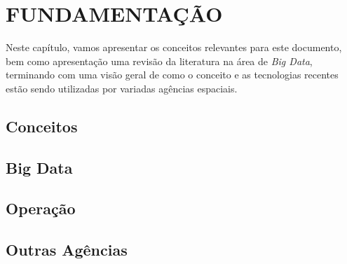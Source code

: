 
\chapter{FUNDAMENTAÇÃO}

Neste capítulo, vamos apresentar os conceitos relevantes para este documento, bem como apresentação uma revisão da literatura na área de \textit{Big Data}, terminando com uma visão geral de como o conceito e as tecnologias recentes estão sendo utilizadas por variadas agências espaciais.

\section{Conceitos}

\section{Big Data}

\section{Operação}

\section{Outras Agências}


